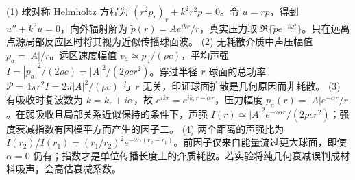 (1) 球对称 Helmholtz 方程为 \((r^2p_r)_r+k^2r^2p=0\)。令 \(u=rp\)，得到 \(u''+k^2u=0\)，向外辐射解为 \(\widetilde p(r)=A e^{ikr}/r\)，真实压力取 \(\Re\{\widetilde p e^{-i\omega t}\}\)。只在远离点源局部反应区时将其视为近似传播球面波。
(2) 无耗散介质中声压幅值 \(p_a=|A|/r\)。远区速度幅值 \(v_a\simeq p_a/(\rho c)\)，平均声强 \(I=|p_a|^2/(2\rho c)=|A|^2/(2\rho c r^2)\)。穿过半径 \(r\) 球面的总功率 \(\mathcal P=4\pi r^2I=2\pi|A|^2/(\rho c)\) 与 \(r\) 无关，印证球面扩散是几何原因而非耗散。
(3) 有吸收时复波数为 \(k=k_r+i\alpha\)，故 \(e^{ikr}=e^{ik_rr-\alpha r}\)，压力幅度 \(p_a(r)=|A|e^{-\alpha r}/r\)。在弱吸收且局部关系近似保持的条件下，声强 \(I(r)\simeq|A|^2e^{-2\alpha r}/(2\rho cr^2)\)；强度衰减指数有因模平方而产生的因子二。
(4) 两个距离的声强比为 \(I(r_2)/I(r_1)=(r_1/r_2)^2e^{-2\alpha(r_2-r_1)}\)。前因子仅来自能量流过更大球面，即使 \(\alpha=0\) 仍有；指数才是单位传播长度上的介质耗散。若实验将纯几何衰减误判成材料吸声，会高估衰减系数。
